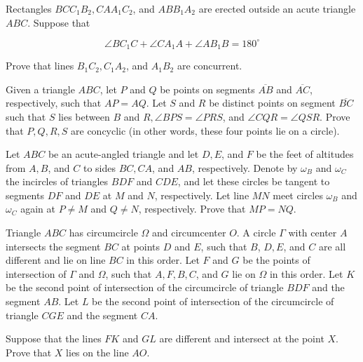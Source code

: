 Rectangles $B C C_1 B_2, C A A_1 C_2$, and $A B B_1 A_2$ are erected outside an acute triangle $A B C$. Suppose that

$$
\angle B C_1 C+\angle C A_1 A+\angle A B_1 B=180^{\circ}
$$


Prove that lines $B_1 C_2, C_1 A_2$, and $A_1 B_2$ are concurrent.

Given a triangle $A B C$, let $P$ and $Q$ be points on segments $\overline{A B}$ and $\overline{A C}$, respectively, such that $A P=A Q$. Let $S$ and $R$ be distinct points on segment $\overline{B C}$ such that $S$ lies between $B$ and $R, \angle B P S=\angle P R S$, and $\angle C Q R=\angle Q S R$. Prove that $P, Q, R, S$ are concyclic (in other words, these four points lie on a circle).

Let $A B C$ be an acute-angled triangle and let $D, E$, and $F$ be the feet of altitudes from $A, B$, and $C$ to sides $B C, C A$, and $A B$, respectively. Denote by $\omega_B$ and $\omega_C$ the incircles of triangles $B D F$ and $C D E$, and let these circles be tangent to segments $D F$ and $D E$ at $M$ and $N$, respectively. Let line $M N$ meet circles $\omega_B$ and $\omega_C$ again at $P \neq M$ and $Q \neq N$, respectively. Prove that $M P=N Q$.

Triangle $A B C$ has circumcircle $\Omega$ and circumcenter $O$. A circle $\Gamma$ with center $A$ intersects the segment $B C$ at points $D$ and $E$, such that $B$, $D, E$, and $C$ are all different and lie on line $B C$ in this order. Let $F$ and $G$ be the points of intersection of $\Gamma$ and $\Omega$, such that $A, F, B, C$, and $G$ lie on $\Omega$ in this order. Let $K$ be the second point of intersection of the circumcircle of triangle $B D F$ and the segment $A B$. Let $L$ be the second point of intersection of the circumcircle of triangle $C G E$ and the segment $C A$.

Suppose that the lines $F K$ and $G L$ are different and intersect at the point $X$. Prove that $X$ lies on the line $A O$.

